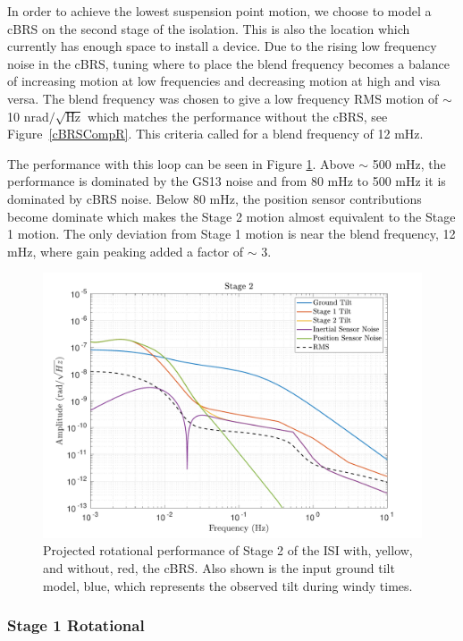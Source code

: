 \documentclass [12pt, proquest]{uwthesis}[2019]
\begin{document}
In order to achieve the lowest suspension point motion, we choose to model a cBRS on the second stage of the isolation. This is also the location which currently has enough space to install a device. Due to the rising low frequency noise in the cBRS, tuning where to place the blend frequency becomes a balance of increasing motion at low frequencies and decreasing motion at high and visa versa. The blend frequency was chosen to give a low frequency RMS motion of $\sim$ 10 nrad$/\sqrt{\text{Hz}}$ which matches the performance without the cBRS, see Figure~\ref{cBRSCompR}. This criteria called for a blend frequency of 12 mHz.

The performance with this loop can be seen in Figure \ref{cBRS2R}. Above $\sim$ 500 mHz, the performance is dominated by the GS13 noise and from 80 mHz to 500 mHz it is dominated by cBRS noise. Below 80 mHz, the position sensor contributions become dominate which makes the Stage 2 motion almost equivalent to the Stage 1 motion. The only deviation from Stage 1 motion is near the blend frequency, 12 mHz, where gain peaking added a factor of $\sim$ 3. 

\begin{figure}[!h]
\begin{center}
\includegraphics[width=\textwidth]{cBRS_Model_ST2RX.pdf}
\caption{Projected rotational performance of Stage 2 of the ISI with, yellow, and without, red, the cBRS. Also shown is the input ground tilt model, blue, which represents the observed tilt during windy times.}
\label{cBRS2R}
\end{center}
\end{figure}

\subsubsection{Stage 1 Rotational}
\end{document}
